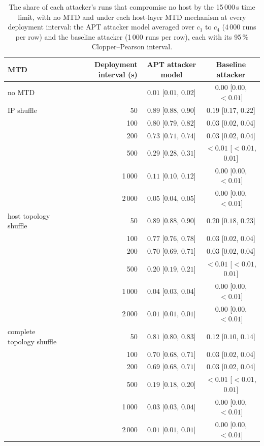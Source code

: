 
\begin{table}[htbp]
\centering
\caption[The share of runs that compromise no host, under the host layer]{The share of each attacker's runs that compromise no host by the 15\,000\,s time limit, with no MTD and under each host-layer MTD mechanism at every deployment interval: the APT attacker model averaged over $c_1$ to $c_4$ (4\,000 runs per row) and the baseline attacker (1\,000 runs per row), each with its 95\,\% Clopper--Pearson interval.}
\label{tab:fa-foothold}
\tablestyle
\begin{tabular}{@{}l r c c@{}}
\toprule
MTD & Deployment interval (s) & APT attacker model & Baseline attacker \\
\midrule
no MTD & & $0.01$ [$0.01$, $0.02$] & $0.00$ [$0.00$, ${<}0.01$] \\
\midrule
IP shuffle & 50 & $0.89$ [$0.88$, $0.90$] & $0.19$ [$0.17$, $0.22$] \\
 & 100 & $0.80$ [$0.79$, $0.82$] & $0.03$ [$0.02$, $0.04$] \\
 & 200 & $0.73$ [$0.71$, $0.74$] & $0.03$ [$0.02$, $0.04$] \\
 & 500 & $0.29$ [$0.28$, $0.31$] & ${<}0.01$ [${<}0.01$, $0.01$] \\
 & 1\,000 & $0.11$ [$0.10$, $0.12$] & $0.00$ [$0.00$, ${<}0.01$] \\
 & 2\,000 & $0.05$ [$0.04$, $0.05$] & $0.00$ [$0.00$, ${<}0.01$] \\
\midrule
host topology shuffle & 50 & $0.89$ [$0.88$, $0.90$] & $0.20$ [$0.18$, $0.23$] \\
 & 100 & $0.77$ [$0.76$, $0.78$] & $0.03$ [$0.02$, $0.04$] \\
 & 200 & $0.70$ [$0.69$, $0.71$] & $0.03$ [$0.02$, $0.04$] \\
 & 500 & $0.20$ [$0.19$, $0.21$] & ${<}0.01$ [${<}0.01$, $0.01$] \\
 & 1\,000 & $0.04$ [$0.03$, $0.04$] & $0.00$ [$0.00$, ${<}0.01$] \\
 & 2\,000 & $0.01$ [$0.01$, $0.01$] & $0.00$ [$0.00$, ${<}0.01$] \\
\midrule
complete topology shuffle & 50 & $0.81$ [$0.80$, $0.83$] & $0.12$ [$0.10$, $0.14$] \\
 & 100 & $0.70$ [$0.68$, $0.71$] & $0.03$ [$0.02$, $0.04$] \\
 & 200 & $0.69$ [$0.68$, $0.71$] & $0.03$ [$0.02$, $0.04$] \\
 & 500 & $0.19$ [$0.18$, $0.20$] & ${<}0.01$ [${<}0.01$, $0.01$] \\
 & 1\,000 & $0.03$ [$0.03$, $0.04$] & $0.00$ [$0.00$, ${<}0.01$] \\
 & 2\,000 & $0.01$ [$0.01$, $0.01$] & $0.00$ [$0.00$, ${<}0.01$] \\
\bottomrule
\end{tabular}
\end{table}
